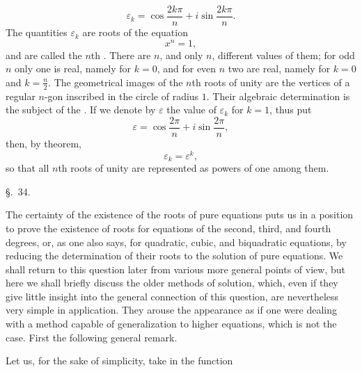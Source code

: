 
\begin{equation}
 \varepsilon_k=\cos\frac{2k\pi}{n}+i\sin\frac{2k\pi}{n}.
\tag{11}
\end{equation}
The quantities $\varepsilon_k$ are roots of the equation
\begin{equation}
 x^n=1,
\tag{12}
\end{equation}
and are called the $n$th . There are $n$, and only $n$, different values of them; for odd $n$ only one is real, namely for $k=0$, and for even $n$ two are real, namely for $k=0$ and $k=\frac n2$. The geometrical images of the $n$th roots of unity are the vertices of a regular $n$-gon inscribed in the circle of radius $1$. Their algebraic determination is the subject of the . If we denote by $\varepsilon$ the value of $\varepsilon_k$ for $k=1$, thus put
\[
 \varepsilon=\cos\frac{2\pi}{n}+i\sin\frac{2\pi}{n},
\]
then, by  theorem,
\[
 \varepsilon_k=\varepsilon^k,
\]
so that all $n$th roots of unity are represented as powers of one among them.


\begin{center}
{\large \S.\ 34.}

\vspace{0.5em}
{\large{}}
\end{center}

The certainty of the existence of the roots of pure equations puts us in a position to prove the existence of roots for equations of the second, third, and fourth degrees, or, as one also says, for quadratic, cubic, and biquadratic equations, by reducing the determination of their roots to the solution of pure equations. We shall return to this question later from various more general points of view, but here we shall briefly discuss the older methods of solution, which, even if they give little insight into the general connection of this question, are nevertheless very simple in application. They arouse the appearance as if one were dealing with a method capable of generalization to higher equations, which is not the case. First the following general remark.

Let us, for the sake of simplicity, take in the function
